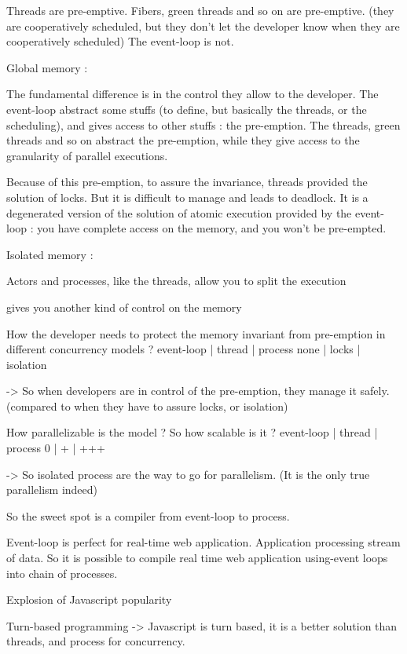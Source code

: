 Threads are pre-emptive.
Fibers, green threads and so on are pre-emptive. (they are cooperatively scheduled, but they don't let the developer know when they are cooperatively scheduled)
The event-loop is not.

Global memory :

The fundamental difference is in the control they allow to the developer.
The event-loop abstract some stuffs (to define, but basically the threads, or the scheduling), and gives access to other stuffs : the pre-emption.
The threads, green threads and so on abstract the pre-emption, while they give access to the granularity of parallel executions.

Because of this pre-emption, to assure the invariance, threads provided the solution of locks.
But it is difficult to manage and leads to deadlock.
It is a degenerated version of the solution of atomic execution provided by the event-loop : you have complete access on the memory, and you won't be pre-empted.

Isolated memory :

Actors and processes, like the threads, allow you to split the execution 

 gives you another kind of control on the memory






How the developer needs to protect the memory invariant from pre-emption in different concurrency models ?
  event-loop  |  thread  |   process
     none     |  locks   |  isolation

-> So when developers are in control of the pre-emption, they manage it safely.
(compared to when they have to assure locks, or isolation)


How parallelizable is the model ? So how scalable is it ?
  event-loop  |  thread  |   process
       0      |     +    |     +++

-> So isolated process are the way to go for parallelism.
(It is the only true parallelism indeed)

So the sweet spot is a compiler from event-loop to process.


Event-loop is perfect for real-time web application.
Application processing stream of data.
So it is possible to compile real time web application using-event loops into chain of processes.



Explosion of Javascript popularity

Turn-based programming
  -> Javascript is turn based, it is a better solution than threads, and process for concurrency.






